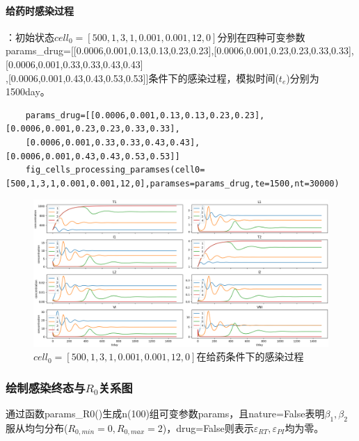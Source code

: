 \documentclass{ctexart}
\begin{document}
    \paragraph{给药时感染过程}：初始状态$cell_{0}=[500,1,3,1,0.001,0.001,12,0]$分别在四种可变参数\\params\_drug=[[0.0006,0.001,0.13,0.13,0.23,0.23],[0.0006,0.001,0.23,0.23,0.33,0.33],[0.0006,0.001,0.33,0.33,0.43,0.43]\\,[0.0006,0.001,0.43,0.43,0.53,0.53]]条件下的感染过程，模拟时间($t_{e}$)分别为1500day。
    \begin{lstlisting}
    params_drug=[[0.0006,0.001,0.13,0.13,0.23,0.23],[0.0006,0.001,0.23,0.23,0.33,0.33],
    [0.0006,0.001,0.33,0.33,0.43,0.43],[0.0006,0.001,0.43,0.43,0.53,0.53]]
    fig_cells_processing_paramses(cell0=[500,1,3,1,0.001,0.001,12,0],paramses=params_drug,te=1500,nt=30000)
\end{lstlisting}
    \begin{figure}[H]
        \centering
        \includegraphics[width=0.95\linewidth]{1.3.png}
        \caption{$cell_{0}=[500,1,3,1,0.001,0.001,12,0]$在给药条件下的感染过程}
        \label{fig.1.3}
    \end{figure}

    \subsubsection{绘制感染终态与$R_{0}$关系图}
    通过函数params\_R0()生成n(100)组可变参数params，且nature=False表明$\beta_{1},\beta_{2}$服从均匀分布($R_{0,min}=0,R_{0,max}=2$)，drug=False则表示$\varepsilon _{RT},\varepsilon _{PI}$均为零。
\end{document}
